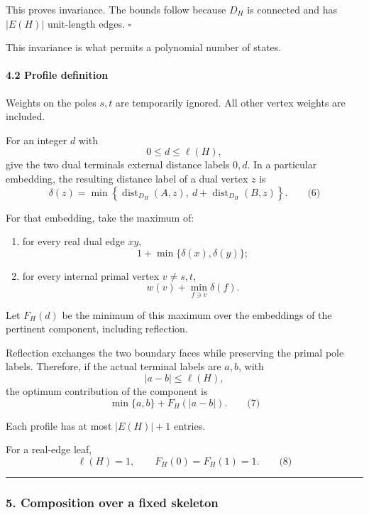 \documentclass[
  11pt,
  a4paper,
]{article}
\providecommand{\tightlist}{%
  \setlength{\itemsep}{0pt}\setlength{\parskip}{0pt}}
\begin{document}
This proves invariance. The bounds follow because \(D_H\) is connected
and has \(|E(H)|\) unit-length edges. \(\square\)

This invariance is what permits a polynomial number of states.

\paragraph{4.2 Profile definition}\label{profile-definition}

Weights on the poles \(s,t\) are temporarily ignored. All other vertex
weights are included.

For an integer \(d\) with \[
0\le d\le \ell(H),
\] give the two dual terminals external distance labels \(0,d\). In a
particular embedding, the resulting distance label of a dual vertex
\(z\) is \[
\delta(z)
=
\min\left\{
\operatorname{dist}_{D_H}(A,z),\
d+\operatorname{dist}_{D_H}(B,z)
\right\}.
\qquad\text{(6)}
\]

For that embedding, take the maximum of:

\begin{enumerate}
\def\labelenumi{\arabic{enumi}.}
\tightlist
\item
  for every real dual edge \(xy\), \[
  1+\min\{\delta(x),\delta(y)\};
  \]
\item
  for every internal primal vertex \(v\ne s,t\), \[
  w(v)+\min_{f\ni v}\delta(f).
  \]
\end{enumerate}

Let \(F_H(d)\) be the minimum of this maximum over the embeddings of the
pertinent component, including reflection.

Reflection exchanges the two boundary faces while preserving the primal
pole labels. Therefore, if the actual terminal labels are \(a,b\), with
\[
|a-b|\le \ell(H),
\] the optimum contribution of the component is \[
\min\{a,b\}+F_H(|a-b|).
\qquad\text{(7)}
\]

Each profile has at most \(|E(H)|+1\) entries.

For a real-edge leaf, \[
\ell(H)=1,\qquad F_H(0)=F_H(1)=1.
\qquad\text{(8)}
\]

\begin{center}\rule{0.5\linewidth}{0.5pt}\end{center}

\subsubsection{5. Composition over a fixed
skeleton}\label{composition-over-a-fixed-skeleton}
\end{document}
